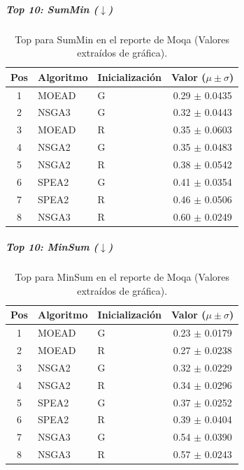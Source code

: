 \documentclass[a4paper,10pt]{article}
\begin{document}
\subparagraph{Top 10: SumMin ($\downarrow$)}
\begin{table}[H]
    \centering
    \begin{tabular}{cllc}
        \toprule
        Pos & Algoritmo & Inicialización & Valor ($\mu \pm \sigma$) \\
        \midrule
        1 & MOEAD & G & 0.29 $\pm$ 0.0435 \\
        2 & NSGA3 & G & 0.32 $\pm$ 0.0443 \\
        3 & MOEAD & R & 0.35 $\pm$ 0.0603 \\
        4 & NSGA2 & G & 0.35 $\pm$ 0.0483 \\
        5 & NSGA2 & R & 0.38 $\pm$ 0.0542 \\
        6 & SPEA2 & G & 0.41 $\pm$ 0.0354 \\
        7 & SPEA2 & R & 0.46 $\pm$ 0.0506 \\
        8 & NSGA3 & R & 0.60 $\pm$ 0.0249 \\
        \bottomrule
    \end{tabular}
    \caption{Top para SumMin en el reporte de Moqa (Valores extraídos de gráfica).}
\end{table}

\subparagraph{Top 10: MinSum ($\downarrow$)}
\begin{table}[H]
    \centering
    \begin{tabular}{cllc}
        \toprule
        Pos & Algoritmo & Inicialización & Valor ($\mu \pm \sigma$) \\
        \midrule
        1 & MOEAD & G & 0.23 $\pm$ 0.0179 \\
        2 & MOEAD & R & 0.27 $\pm$ 0.0238 \\
        3 & NSGA2 & G & 0.32 $\pm$ 0.0229 \\
        4 & NSGA2 & R & 0.34 $\pm$ 0.0296 \\
        5 & SPEA2 & G & 0.37 $\pm$ 0.0252 \\
        6 & SPEA2 & R & 0.39 $\pm$ 0.0404 \\
        7 & NSGA3 & G & 0.54 $\pm$ 0.0390 \\
        8 & NSGA3 & R & 0.57 $\pm$ 0.0243 \\
        \bottomrule
    \end{tabular}
    \caption{Top para MinSum en el reporte de Moqa (Valores extraídos de gráfica).}
\end{table}
\end{document}
